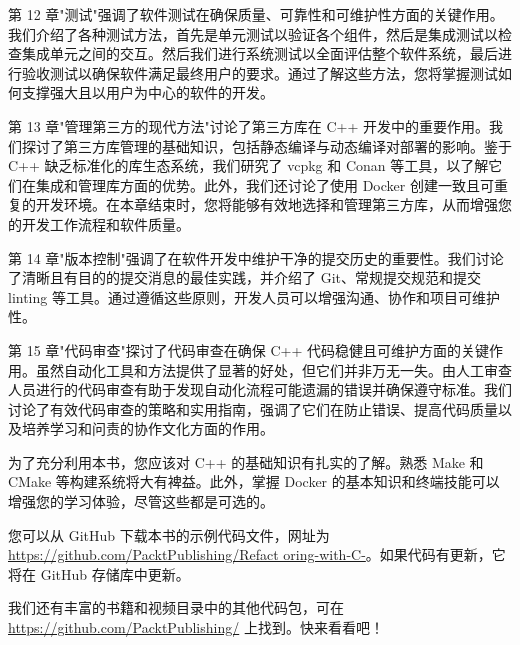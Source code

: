 第 12 章"测试"强调了软件测试在确保质量、可靠性和可维护性方面的关键作用。我们介绍了各种测试方法，首先是单元测试以验证各个组件，然后是集成测试以检查集成单元之间的交互。然后我们进行系统测试以全面评估整个软件系统，最后进行验收测试以确保软件满足最终用户的要求。通过了解这些方法，您将掌握测试如何支撑强大且以用户为中心的软件的开发。

第 13 章"管理第三方的现代方法"讨论了第三方库在 C++ 开发中的重要作用。我们探讨了第三方库管理的基础知识，包括静态编译与动态编译对部署的影响。鉴于 C++ 缺乏标准化的库生态系统，我们研究了 vcpkg 和 Conan 等工具，以了解它们在集成和管理库方面的优势。此外，我们还讨论了使用 Docker 创建一致且可重复的开发环境。在本章结束时，您将能够有效地选择和管理第三方库，从而增强您的开发工作流程和软件质量。

第 14 章"版本控制"强调了在软件开发中维护干净的提交历史的重要性。我们讨论了清晰且有目的的提交消息的最佳实践，并介绍了 Git、常规提交规范和提交 linting 等工具。通过遵循这些原则，开发人员可以增强沟通、协作和项目可维护性。

第 15 章"代码审查"探讨了代码审查在确保 C++ 代码稳健且可维护方面的关键作用。虽然自动化工具和方法提供了显著的好处，但它们并非万无一失。由人工审查人员进行的代码审查有助于发现自动化流程可能遗漏的错误并确保遵守标准。我们讨论了有效代码审查的策略和实用指南，强调了它们在防止错误、提高代码质量以及培养学习和问责的协作文化方面的作用。


为了充分利用本书，您应该对 C++ 的基础知识有扎实的了解。熟悉 Make 和 CMake 等构建系统将大有裨益。此外，掌握 Docker 的基本知识和终端技能可以增强您的学习体验，尽管这些都是可选的。


您可以从 GitHub 下载本书的示例代码文件，网址为 \url{https://github.com/PacktPublishing/Refact oring-with-C-}。如果代码有更新，它将在 GitHub 存储库中更新。

我们还有丰富的书籍和视频目录中的其他代码包，可在 \url{https://github.com/PacktPublishing/} 上找到。快来看看吧！
